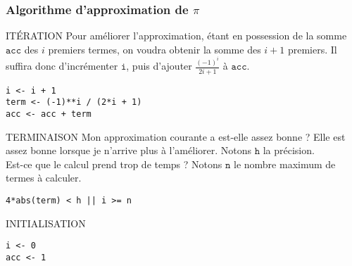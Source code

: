 \documentclass[10pt]{beamer}
\begin{document}
\begin{frame}[fragile]
  \frametitle{Algorithme d'approximation de $\pi$}
  \begin{block}{ITÉRATION}
    Pour \alert{améliorer} l'approximation, étant en possession de la somme $\mathtt{acc}$ des $i$ premiers termes, on voudra obtenir la somme des $i+1$ premiers. Il suffira donc d'incrémenter $\mathtt{i}$, \alert{puis} d'ajouter $ \frac{(-1)^{i}}{2i+ 1}$ à $\mathtt{acc}$.
    \begin{lstlisting}[style=editor]
i <- i + 1
term <- (-1)**i / (2*i + 1)
acc <- acc + term

    \end{lstlisting}
  \end{block}

  \begin{block}{TERMINAISON}
    Mon approximation courante a est-elle \alert{assez bonne} ? Elle est assez bonne lorsque je n'arrive plus à l'améliorer. Notons $\mathtt{h}$ la précision. \\
     Est-ce que le calcul \alert{prend trop de temps} ? Notons $\mathtt{n}$ le nombre maximum de termes à calculer.
\begin{lstlisting}[style=editor]
 4*abs(term) < h || i >= n
\end{lstlisting}
\end{block}
\begin{block}{INITIALISATION}
  \begin{lstlisting}[style=edblock]
i <- 0
acc <- 1
\end{lstlisting}
\end{block}
\end{frame}
\end{document}
